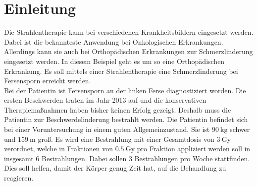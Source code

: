 \section{Einleitung}
\label{sec:Einleitung}

Die Strahlentherapie kann bei verschiedenen Krankheitsbildern eingesetzt werden.
Dabei ist die bekannteste Anwendung bei Onkologischen Erkrankungen. Allerdings
kann sie auch bei Orthopädischen Erkrankungen zur Schmerzlinderung eingesetzt werden.
In diesem Beispiel geht es um so eine Orthopädischen Erkrankung.
Es soll mittels einer Strahlentherapie eine Schmerzlinderung bei Fersensporn erreicht werden. \\

Bei der Patientin ist Fersensporn an der linken Ferse diagnostiziert worden.
Die ersten Beschwerden traten im Jahr 2013 auf
und die konservativen Therapiemaßnahmen haben bisher keinen Erfolg gezeigt. Deshalb muss die Patientin zur Beschwerdelinderung
bestrahlt werden. Die Patientin befindet sich bei einer Voruntersuchung in einem guten Allgemeinzustand.
Sie ist $\SI{90}{\kilo\gram}$ schwer und $\SI{159}{\meter}$ groß.
Es wird eine Bestrahlung mit einer Gesamtdosis von $\SI{3}{\gray}$ verordnet, welche in Fraktionen von
$\SI{0.5}{\gray}$ pro Fraktion appliziert werden soll in insgesamt 6 Bestrahlungen.
Dabei sollen 3 Bestrahlungen pro Woche stattfinden.
Dies soll helfen, damit der Körper genug Zeit hat, auf die Behandlung zu reagieren.

